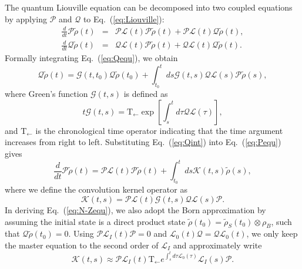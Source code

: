\documentclass[english,nofootinbib, pra, twocolumn,superscriptaddress]{revtex4-1}
\begin{document}
The quantum Liouville equation can be decomposed into two coupled
equations by applying $\mathcal{P}$ and $\mathcal{Q}$ to Eq.~(\ref{eq:Liouville}):
\begin{eqnarray}
\frac{d}{dt}\mathcal{P}\tilde{\rho}(t) & = & \mathcal{P}\mathcal{L}(t)\mathcal{P}\tilde{\rho}(t)+\mathcal{P}\mathcal{L}(t)\mathcal{Q}\tilde{\rho}(t),\label{eq:Pequ}\\
\frac{d}{dt}\mathcal{Q}\tilde{\rho}(t) & = & \mathcal{Q}\mathcal{L}(t)\mathcal{P}\tilde{\rho}(t)+\mathcal{Q}\mathcal{L}(t)\mathcal{Q}\tilde{\rho}(t).\label{eq:Qequ}
\end{eqnarray}
Formally integrating Eq.~(\ref{eq:Qequ}), we obtain
\begin{equation}
\mathcal{Q}\tilde{\rho}(t)=\mathcal{G}(t,t_{0})\mathcal{Q}\tilde{\rho}(t_{0})+\int_{t_{0}}^{t}ds\mathcal{G}(t,s)\mathcal{Q}\mathcal{L}(s)\mathcal{P}\tilde{\rho}(s),\label{eq:Qint}
\end{equation}
where Green's function $\mathcal{G}\left(t,s\right)$ is defined as
\begin{equation}t
\mathcal{G}(t,s)=\mbox{T}_{\leftarrow}\exp[\int_{s}^{t}d\tau\mathcal{Q}\mathcal{L}(\tau)],
\end{equation}
and $\mbox{T}_{\leftarrow}$ is the chronological time operator indicating that
the time argument increases from right to left. Substituting Eq.~(\ref{eq:Qint})
into Eq.~(\ref{eq:Pequ}) gives
\begin{equation}
\frac{d}{dt}\mathcal{P}\tilde{\rho}(t)=\mathcal{P}\mathcal{L}(t)\mathcal{P}\tilde{\rho}(t)+\int_{t_{0}}^{t}ds\mathcal{K}(t,s)\tilde{\rho}(s),\label{eq:N-Zequ}
\end{equation}
where we define the convolution kernel operator as
\begin{equation}
\mathcal{K}(t,s)=\mathcal{P}\mathcal{L}(t)\mathcal{G}(t,s)\mathcal{Q}\mathcal{L}(s)\mathcal{P}.\label{eq:kernel}
\end{equation}
In deriving Eq.~(\ref{eq:N-Zequ}), we also adopt the Born approximation
by assuming the initial state is a direct product state $\tilde{\rho}(t_{0})=\tilde{\rho}_{S}(t_{0})\otimes\rho_{B}$,
such that $\mathcal{Q}\tilde{\rho}(t_{0})=0$. Using $\mathcal{P}\mathcal{L}_{I}(t)\mathcal{P}=0$
and $\mathcal{L}_{\text{0}}(t)\mathcal{Q}=\mathcal{Q}\mathcal{L}_{\text{0}}(t)$,
we only keep the master
equation to the second order of $\mathcal{L}_{I}$ and approximately write
\begin{equation}
\mathcal{K}(t,s)\approx\mathcal{P}\mathcal{L}_{I}(t)\mbox{T}_{\leftarrow}e^{\int_{s}^{t}d\tau\mathcal{L}_{\text{0}}(\tau)}\mathcal{L}_{I}(s)\mathcal{P}.\label{eq:K}
\end{equation}
\end{document}
